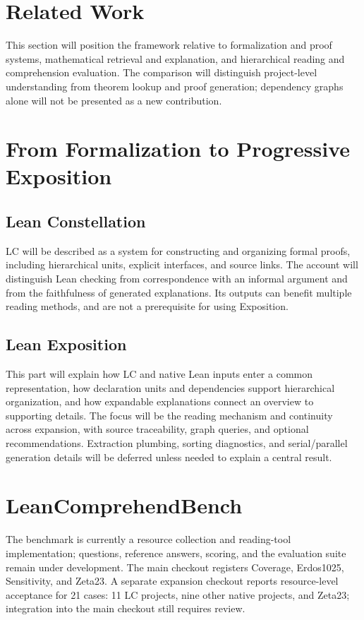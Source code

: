 \documentclass{article}
\begin{document}
\section{Related Work}
\label{sec:related}
This section will position the framework relative to formalization and proof systems, mathematical retrieval and explanation, and hierarchical reading and comprehension evaluation. The comparison will distinguish project-level understanding from theorem lookup and proof generation; dependency graphs alone will not be presented as a new contribution.

\section{From Formalization to Progressive Exposition}
\label{sec:method}
\subsection{Lean Constellation}
LC will be described as a system for constructing and organizing formal proofs, including hierarchical units, explicit interfaces, and source links. The account will distinguish Lean checking from correspondence with an informal argument and from the faithfulness of generated explanations. Its outputs can benefit multiple reading methods, and are not a prerequisite for using Exposition.

\subsection{Lean Exposition}
This part will explain how LC and native Lean inputs enter a common representation, how declaration units and dependencies support hierarchical organization, and how expandable explanations connect an overview to supporting details. The focus will be the reading mechanism and continuity across expansion, with source traceability, graph queries, and optional recommendations. Extraction plumbing, sorting diagnostics, and serial/parallel generation details will be deferred unless needed to explain a central result.

\section{LeanComprehendBench}
\label{sec:benchmark}
The benchmark is currently a resource collection and reading-tool implementation; questions, reference answers, scoring, and the evaluation suite remain under development. The main checkout registers Coverage, Erdos1025, Sensitivity, and Zeta23. A separate expansion checkout reports resource-level acceptance for 21 cases: 11 LC projects, nine other native projects, and Zeta23; integration into the main checkout still requires review.
\end{document}
